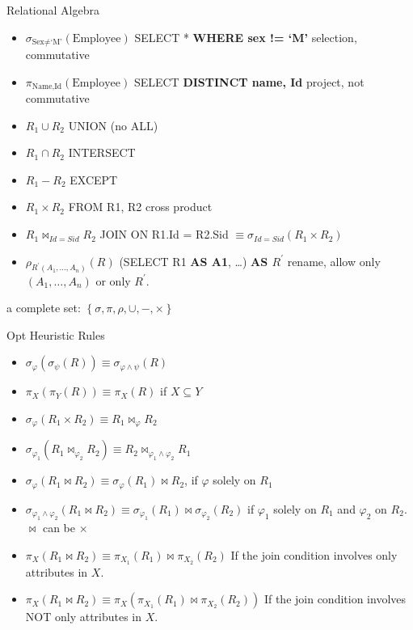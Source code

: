 \documentclass[a4paper]{article}
\begin{document}
\begin{cheatsheetblock}{Relational Algebra}
    \begin{itemize}
        \item $\sigma_{\text {Sex}\neq\text {`M'}} (\text{Employee})$ \hfill SELECT * \textbf{WHERE sex != `M'}
              \subitem selection, commutative
        \item $\pi_{\text {Name}, \text {Id}} (\text {Employee})$ \hfill SELECT \textbf{DISTINCT name, Id}
              \subitem project, not commutative
        \item $R_1 \cup R_2$ \hfill UNION (no ALL)
        \item $R_1 \cap R_2$ \hfill INTERSECT
        \item $R_1 - R_2$ \hfill EXCEPT
        \item $R_1 \times R_2$ \hfill FROM R1, R2
              \subitem cross product
        \item $R_1 \bowtie_{Id = Sid} R_2$ \hfill JOIN ON R1.Id = R2.Sid
              \subitem $\equiv \sigma_{Id = Sid} (R_1 \times R_2)$
        \item $\rho_{R^{\prime}\left(A_1, \dots, A_n\right)}(R)$ \hfill (SELECT R1 \textbf{AS A1}, \dots) \textbf{AS $R^{\prime}$}
              \subitem rename, allow only $\left(A_1, \dots, A_n\right)$ or only $R^{\prime}$.
    \end{itemize}
    a complete set: $\left\{\sigma, \pi, \rho, \cup, -, \times\right\}$
\end{cheatsheetblock}

\begin{cheatsheetblock} {Opt Heuristic Rules}
    \begin{itemize}
        \item $\sigma_{\varphi}\left(\sigma_\psi(R)\right) \equiv \sigma_{\varphi \wedge \psi}(R)$
        \item $\pi_X\left(\pi_Y(R)\right) \equiv \pi_X(R)$ if $X \subseteq Y$
        \item $\sigma_{\varphi}\left(R_1 \times R_2\right) \equiv R_1 \bowtie_{\varphi} R_2$
        \item $\sigma_{\varphi_1}\left(R_1 \bowtie_{\varphi_2} R_2\right) \equiv R_2 \bowtie_{\varphi_1 \wedge \varphi_2} R_1$
        \item $\sigma_{\varphi}\left(R_1 \bowtie R_2\right) \equiv \sigma_{\varphi}\left(R_1\right) \bowtie R_2$, if $\varphi$ solely on $R_1$
        \item $\sigma_{\varphi_1 \wedge \varphi_2}\left(R_1 \bowtie R_2\right) \equiv \sigma_{\varphi_1}\left(R_1\right) \bowtie \sigma_{\varphi_2}\left(R_2\right)$
              if $\varphi_1$ solely on $R_1$ and $\varphi_2$ on $R_2$. $\bowtie$ can be $\times$
        \item $\pi_X\left(R_1 \bowtie R_2\right) \equiv \pi_{X_1}\left(R_1\right) \bowtie \pi_{X_2}\left(R_2\right)$ If the join condition involves only attributes in $X$.
        \item $\pi_X\left(R_1 \bowtie R_2\right) \equiv \pi_X\left(\pi_{X_1}\left(R_1\right) \bowtie \pi_{X_2}\left(R_2\right)\right)$ If the join condition involves NOT only attributes in $X$.
    \end{itemize}
\end{cheatsheetblock}
\end{document}
